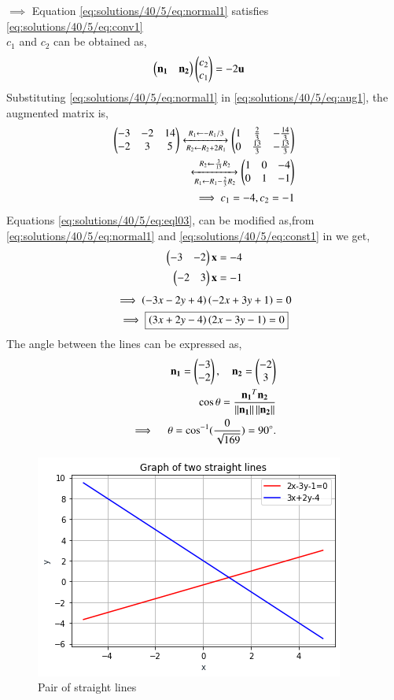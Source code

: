 $\implies$ Equation \eqref{eq:solutions/40/5/eq:normal1} satisfies \eqref{eq:solutions/40/5/eq:conv1}\\
$c_1$ and $c_2$ can be obtained as,
\begin{align}
\begin{pmatrix}\mathbf{n_1} & \mathbf{n_2}\end{pmatrix}\begin{pmatrix}c_2\\c_1\end{pmatrix}&=-2\mathbf{u} \label{eq:solutions/40/5/eq:aug1}
\end{align}
Substituting \eqref{eq:solutions/40/5/eq:normal1} in \eqref{eq:solutions/40/5/eq:aug1}, the augmented matrix is,
\begin{align}
\begin{pmatrix}-3 & -2 & 14 \\ -2 & 3 & 5\end{pmatrix}
\xleftrightarrow[R_2\leftarrow R_2+2R_1]{R_1\leftarrow -R_1/3}
\begin{pmatrix}1 &\frac{2}{3} &-\frac{14}{3} \\ 0& \frac{13}{3} & -\frac{13}{3}\end{pmatrix} \label{eq:solutions/40/5/eq:aug5}\\
\xleftrightarrow[R_1\leftarrow R_1-\frac{2}{3}R_2]{R_2\leftarrow \frac{3}{13}R_2}
\begin{pmatrix}1 &0 &-4 \\ 0& 1 & -1\end{pmatrix} \label{eq:solutions/40/5/eq:aug2}\\
\implies c_1 = -4, c_2=-1 \label{eq:solutions/40/5/eq:const1}
\end{align}
Equations \eqref{eq:solutions/40/5/eq:eql03}, can be modified as,from \eqref{eq:solutions/40/5/eq:normal1} and \eqref{eq:solutions/40/5/eq:const1} in we get,
\begin{align}
    \begin{pmatrix}-3 & -2\end{pmatrix}\mathbf{x}&=-4\\
    \begin{pmatrix}-2 & 3\end{pmatrix}\mathbf{x}&=-1
\end{align}
\begin{multline}
\implies \left(-3x-2y+4\right)\left(-2x+3y+1\right)= 0\\
\implies \boxed{\left(3x+2y-4\right)\left(2x-3y-1\right) = 0} \label{eq:solutions/40/5/eq:line1}
\end{multline}
The angle between the lines can be expressed as, 
\begin{align}
	\mathbf{n_1}=\begin{pmatrix}-3\\-2\end{pmatrix} , \quad \mathbf{n_2}=\begin{pmatrix}-2\\3\end{pmatrix}\\
	\cos\theta=\frac{\mathbf{n_1}^T\mathbf{n_2}}{\left\lVert\mathbf{n_1}\right\rVert\left\lVert\mathbf{n_2}\right\rVert} \\
	\implies \quad \theta=\cos^{-1}({\frac{0}{\sqrt{169}}}) = 90\degree.
\end{align}
\begin{figure}[h]
    \centering
    \includegraphics[width=\columnwidth]{./solutions/40/5/A6.png}
    \caption{Pair of straight lines}
    \label{eq:solutions/40/5/Fig :1}
\end{figure}
